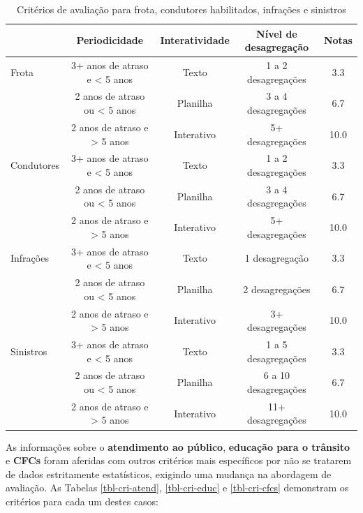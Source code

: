 \documentclass[
  a4paper,
]{article}
\begin{document}
\begin{longtable}{l|cccc}

\caption{\label{tbl-criterios}Critérios de avaliação para frota,
condutores habilitados, infrações e sinistros}

\tabularnewline

\toprule
\multicolumn{1}{l}{} & Periodicidade & Interatividade & Nível de desagregação & Notas \\ 
\midrule\addlinespace[2.5pt]
Frota & 3+ anos de atraso e < 5 anos & Texto & 1 a 2 desagregações & 3.3 \\ 
 & 2 anos de atraso ou < 5 anos & Planilha & 3 a 4 desagregações & 6.7 \\ 
 & 2 anos de atraso e > 5 anos & Interativo & 5+ desagregações & 10.0 \\ 
\midrule\addlinespace[2.5pt]
Condutores & 3+ anos de atraso e < 5 anos & Texto & 1 a 2 desagregações & 3.3 \\ 
 & 2 anos de atraso ou < 5 anos & Planilha & 3 a 4 desagregações & 6.7 \\ 
 & 2 anos de atraso e > 5 anos & Interativo & 5+ desagregações & 10.0 \\ 
\midrule\addlinespace[2.5pt]
Infrações & 3+ anos de atraso e < 5 anos & Texto & 1 desagregação & 3.3 \\ 
 & 2 anos de atraso ou < 5 anos & Planilha & 2 desagregações & 6.7 \\ 
 & 2 anos de atraso e > 5 anos & Interativo & 3+ desagregações & 10.0 \\ 
\midrule\addlinespace[2.5pt]
Sinistros & 3+ anos de atraso e < 5 anos & Texto & 1 a 5 desagregações & 3.3 \\ 
 & 2 anos de atraso ou < 5 anos & Planilha & 6 a 10 desagregações & 6.7 \\ 
 & 2 anos de atraso e > 5 anos & Interativo & 11+ desagregações & 10.0 \\ 
\bottomrule

\end{longtable}

As informações sobre o \textbf{atendimento ao público}, \textbf{educação
para o trânsito} e \textbf{CFCs} foram aferidas com outros critérios
mais específicos por não se tratarem de dados estritamente estatísticos,
exigindo uma mudança na abordagem de avaliação. As Tabelas
\ref{tbl-cri-atend}, \ref{tbl-cri-educ} e \ref{tbl-cri-cfcs} demonstram
os critérios para cada um destes casos:
\end{document}
